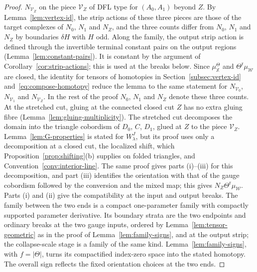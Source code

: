 \documentclass[11pt]{amsart}
\theoremstyle{definition}
\theoremstyle{remark}
\theoremstyle{plain}
\numberwithin{equation}{section}
\begin{document}
\begin{proof}
$N_{\mathcal V_Z}$ on the piece $\mathcal V_Z$ of DFL type for $(A_0,A_1)$ beyond
$Z$. By Lemma~\ref{lem:vertex-id}, the strip actions of these
three pieces are those of the target complexes of $N_0$, $N_1$ and
$N_Z$, and the three counts differ from $N_0$, $N_1$ and $N_Z$ by
boundaries $\delta H$ with $H$ odd. Along the family, the output strip
action is defined through the invertible terminal constant pairs on
the output regions (Lemma~\ref{lem:constant-pairs}). It is constant by
the argument of Corollary~\ref{cor:strip-actions}; this is used at the
breaks below. Since
$\mu_{\mathbb X}^\Theta$ and $\Theta^{\mathrm r}\mu_{\mathscr W}$ are closed,
the identity for tensors of homotopies in Section~\ref{subsec:vertex-id}
and~\eqref{eq:compose-homotopy} reduce the lemma to the same statement
for $N_{\mathcal V_0}$, $N_{\mathcal V_1}$ and $N_{\mathcal V_Z}$. In the
rest of the proof $N_0$, $N_1$ and $N_Z$ denote these three counts. At
the stretched cut, gluing at the connected closed cut $Z$ has no extra
gluing fibre (Lemma~\ref{lem:gluing-multiplicity}). The stretched cut
decomposes the domain into the triangle cobordism of $D_0$, $C$, $D_1$,
glued at $Z$ to the piece $\mathcal V_Z$. Lemma~\ref{lem:G-properties} is
stated for $W^J_\lambda$, but its proof uses only a decomposition at a
closed cut, the localized shift, which
Proposition~\ref{prop:shifting}(b) supplies on folded triangles, and
Convention~\ref{conv:interior-line}. The same proof gives parts (i)--(iii)
for this decomposition, and part (iii) identifies the orientation with that
of the gauge cobordism followed by the conversion and the mixed map; this
gives $N_Z\Theta^{\mathrm r}\mu_{\mathscr W}$. Parts (i) and (ii) give the
compatibility at the input and output breaks. The family between the two
ends is a compact one-parameter family with compactly supported parameter
derivative. Its boundary strata are the two endpoints and ordinary breaks
at the two gauge inputs, ordered by Lemma~\ref{lem:tensor-geometric} as in
the proof of Lemma~\ref{lem:family-signs}, and at the output strip; the
collapse-scale stage is a family of the same kind. Lemma~\ref{lem:family-signs},
with $f=|\Theta|$, turns its compactified index-zero space into the stated
homotopy. The overall sign
reflects the fixed orientation choices at the two ends.
\end{proof}
\end{document}
